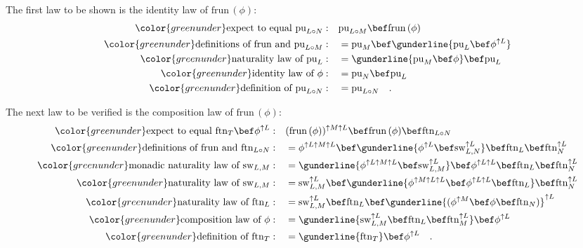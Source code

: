 The first law to be shown is the identity law of $\text{frun}\,(\phi)$:
\begin{align*}
{\color{greenunder}\text{expect to equal }\text{pu}_{L\circ N}:}\quad & \text{pu}_{L\circ M}\bef\text{frun}\,(\phi)\\
{\color{greenunder}\text{definitions of }\text{frun}\text{ and }\text{pu}_{L\circ M}:}\quad & =\text{pu}_{M}\bef\gunderline{\text{pu}_{L}\bef\phi^{\uparrow L}}\\
{\color{greenunder}\text{naturality law of }\text{pu}_{L}:}\quad & =\gunderline{\text{pu}_{M}\bef\phi}\bef\text{pu}_{L}\\
{\color{greenunder}\text{identity law of }\phi:}\quad & =\text{pu}_{N}\bef\text{pu}_{L}\\
{\color{greenunder}\text{definition of }\text{pu}_{L\circ N}:}\quad & =\text{pu}_{L\circ N}\quad.
\end{align*}

The next law to be verified is the composition law of $\text{frun}\,(\phi)$:
\begin{align*}
{\color{greenunder}\text{expect to equal }\text{ftn}_{T}\bef\phi^{\uparrow L}:}\quad & (\text{frun}\,(\phi))^{\uparrow M\uparrow L}\bef\text{frun}\,(\phi)\bef\text{ftn}_{L\circ N}\\
{\color{greenunder}\text{definitions of }\text{frun}\text{ and }\text{ftn}_{L\circ N}:}\quad & =\phi^{\uparrow L\uparrow M\uparrow L}\bef\gunderline{\phi^{\uparrow L}\bef\text{sw}_{L,N}^{\uparrow L}}\bef\text{ftn}_{L}\bef\text{ftn}_{N}^{\uparrow L}\\
{\color{greenunder}\text{monadic naturality law of }\text{sw}_{L,M}:}\quad & =\gunderline{\phi^{\uparrow L\uparrow M\uparrow L}\bef\text{sw}_{L,M}^{\uparrow L}}\bef\phi^{\uparrow L\uparrow L}\bef\text{ftn}_{L}\bef\text{ftn}_{N}^{\uparrow L}\\
{\color{greenunder}\text{naturality law of }\text{sw}_{L,M}:}\quad & =\text{sw}_{L,M}^{\uparrow L}\bef\gunderline{\phi^{\uparrow M\uparrow L\uparrow L}\bef\phi^{\uparrow L\uparrow L}\bef\text{ftn}_{L}}\bef\text{ftn}_{N}^{\uparrow L}\\
{\color{greenunder}\text{naturality law of }\text{ftn}_{L}:}\quad & =\text{sw}_{L,M}^{\uparrow L}\bef\text{ftn}_{L}\bef\gunderline{(\phi^{\uparrow M}\bef\phi\bef\text{ftn}_{N})}^{\uparrow L}\\
{\color{greenunder}\text{composition law of }\phi:}\quad & =\gunderline{\text{sw}_{L,M}^{\uparrow L}\bef\text{ftn}_{L}\bef\text{ftn}_{M}^{\uparrow L}}\bef\phi^{\uparrow L}\\
{\color{greenunder}\text{definition of }\text{ftn}_{T}:}\quad & =\gunderline{\text{ftn}_{T}}\bef\phi^{\uparrow L}\quad.
\end{align*}

